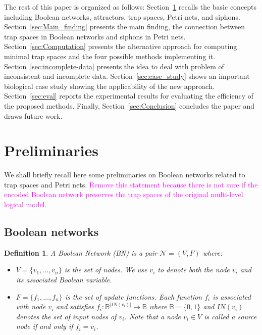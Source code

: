 \documentclass[preprint,12pt]{elsarticle}
\newtheorem{definition}{Definition}[section]
\newcommand{\vangiang}[1]{\textcolor{magenta}{#1}}
\begin{document}
The rest of this paper is organized as follows: Section~\ref{sec:Preliminaries} recalls the basic concepts including Boolean networks, attractors, trap spaces, Petri nets, and siphons.
Section~\ref{sec:Main_finding} presents the main finding, the connection between trap spaces in Boolean networks and siphons in Petri nets.
Section~\ref{sec:Computation} presents the alternative approach for computing minimal trap spaces and the four possible methods implementing it.
Section~\ref{sec:incomplete-data} presents the idea to deal with problem of inconsistent and incomplete data.
Section~\ref{sec:case_study} shows an important biological case study showing the applicability of the new approach.
Section~\ref{sec:eval} reports the experimental results for evaluating the efficiency of the proposed methods.
Finally, Section~\ref{sec:Conclusion} concludes the paper and draws future work.

\section{Preliminaries}
\label{sec:Preliminaries}

We shall briefly recall here some preliminaries on Boolean networks related to trap spaces and Petri nets.
\vangiang{Remove this statement because there is not sure if the encoded Boolean network preserves the trap spaces of the original multi-level logical model.}

\subsection{Boolean networks}

\begin{definition}

  A Boolean Network (BN) is a pair \(\mathcal{N} = (V, F)\) where:
  \begin{itemize}
    \item \(V = \{v_1, \dots, v_n\}\) is the set of nodes.
    We use \(v_i\) to denote both the node \(v_i\) and its associated Boolean variable.
    
    \item \(F = \{f_1, \dots, f_n\}\) is the set of update functions.
    Each function \(f_i\) is associated with node \(v_i\) and satisfies \(f_i \colon \mathbb{B}^{\vert IN(v_i)\vert} \mapsto \mathbb{B}\) where \(\mathbb{B} = \{0, 1\}\) and \(IN(v_i)\) denotes the set of input nodes of \(v_i\).
    Note that a node \(v_i \in V\) is called a \emph{source} node if and only if \(f_{i} = v_i\).
  \end{itemize}

\label{def:BN}
\end{definition}
\end{document}
